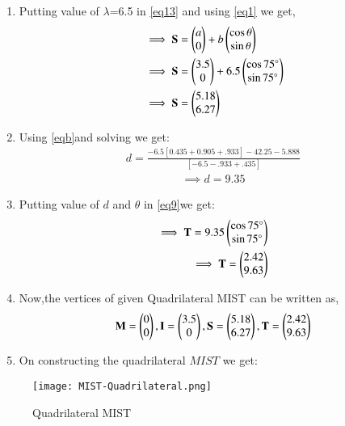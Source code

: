 \documentclass[journal,12pt,twocolumn]{IEEEtran}
\begin{document}
\begin{enumerate}
\item Putting value of $\lambda$=6.5 in \eqref{eq13} and using \eqref{eq1} we get,
\begin{align}
&\implies \mathbf{S}=\begin{pmatrix}a\\0\end{pmatrix} +b\begin{pmatrix}\cos\theta \\\sin \theta \end{pmatrix}
\\
&\implies \mathbf{S}=\begin{pmatrix}3.5\\0\end{pmatrix} +6.5\begin{pmatrix}\cos 75 \degree\\\sin 75 \degree\end{pmatrix} 
\\
&\implies \mathbf{S}=\begin{pmatrix}5.18\\6.27\end{pmatrix}
\end{align}

\item Using \eqref{eqb}and solving we get:
\begin{align}
d= \frac{-6.5[0.435+0.905+.933]-42.25-5.888}{[-6.5-.933+.435]}
\end{align}
\begin{align}
\implies d=9.35
\end{align}
\item Putting value of $d$  and $\theta$ in \eqref{eq9}we get:
\begin{align}
\implies \mathbf{T} =9.35\begin{pmatrix}\cos 75 \degree\\\sin 75 \degree\end{pmatrix}
\\
\implies \mathbf{T}=\begin{pmatrix}2.42\\9.63\end{pmatrix} 
\end{align}
   \item Now,the vertices of given Quadrilateral MIST can be written as,
\begin{align}
 \mathbf{M}=\begin{pmatrix}0\\0\end{pmatrix},\mathbf{I} = \begin{pmatrix}3.5\\0\end{pmatrix}, \mathbf{S}=\begin{pmatrix}5.18\\6.27\end{pmatrix},\mathbf{T}=\begin{pmatrix}2.42\\9.63\end{pmatrix}
\end{align}
    \item On constructing the quadrilateral $MIST$ we get:
\end{enumerate}


\begin{figure}[!ht]
\centering
\texttt{[image: MIST-Quadrilateral.png]}
\caption{Quadrilateral MIST}
\label{fig:Quadrilateral MIST}	
\end{figure}
\end{document}
